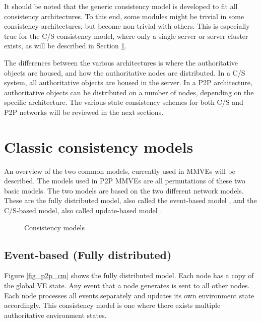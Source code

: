 It should be noted that the generic consistency model is developed to fit all consistency architectures. To this end, some modules might be trivial in some consistency architectures, but become non-trivial with others. This is especially true for the C/S consistency model, where only a single server or server cluster exists, as will be described in Section \ref{classic_models}.

The differences between  the various architectures is where the authoritative objects are  housed, and how the authoritative nodes are distributed. In a C/S system, all authoritative objects are housed in the server. In a P2P architecture, authoritative objects can be distributed on a number of nodes, depending on the specific architecture. The various state consistency schemes for both C/S and P2P networks will be reviewed in the next sections.

\section{Classic consistency models}
\label{classic_models}

An overview of the two common models, currently used in MMVEs will be described. The models used in P2P MMVEs are all permutations of these two basic models. The two models are based on the two different network models. These are the fully distributed model, also called the event-based model \cite{p2p_cm_aoe}, and the C/S-based model, also called update-based model \cite{unreal_networking}.

\begin{figure}[htbp]
\centering {}
\caption{Consistency models}
\end{figure}

\subsection{Event-based (Fully distributed)}
\label{classic_event_based}


Figure \ref{fig_p2p_cm} shows the fully distributed model. Each node has a copy of the global VE state. Any event that a node generates is sent to all other nodes. Each node processes all events separately and updates its own environment state accordingly. This consistency model is one where there exists multiple authoritative environment states.

